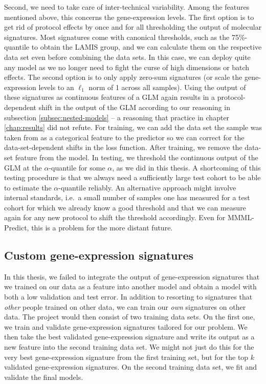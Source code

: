 Second, we need to take care of inter-technical variability. Among the features mentioned above, this concerns 
the gene-expression levels. The first option is to get rid of protocol effects by once and for all
thresholding the output of molecular signatures. Most signatures come with canonical thresholds, 
such as the \num{75}\%-quantile to obtain the LAMIS group, and we can calculate them on the 
respective data set even before combining the data sets. In this case, we can deploy quite any model as we no 
longer need to fight the curse of high dimensions or batch effects. The second option is to only 
apply zero-sum signatures (or scale the gene-expression levels to an $\ell_1$ norm of \num{1} 
across all samples). Using the output of these signatures as continuous features of a GLM again 
results in a protocol-dependent shift in the output of the GLM according to our reasoning in subsection 
\ref{subsec:nested-models} -- a reasoning that practice in chapter \ref{chap:results} did not refute. 
For training, we can add the data set the sample was taken from as a categorical feature to the 
predictor so we can correct for the data-set-dependent shifts in the loss function. 
After training, we remove the data-set feature from the model. In testing, 
we threshold the continuous output of the GLM at the $\alpha$-quantile for some $\alpha$, as we did 
in this thesis. A shortcoming of this testing procedure is that we always need a sufficiently large 
test cohort to be able to estimate the $\alpha$-quantile reliably. An alternative approach might 
involve internal standards, i.e.\ a small number of samples one has measured for a test cohort for 
which we already know a good threshold and that we can measure again for any new protocol to shift 
the threshold accordingly. Even for MMML-Predict, this is a problem for the more distant future.

\subsection{Custom gene-expression signatures}

In this thesis, we failed to integrate the output of gene-expression signatures that we trained 
on our data as a feature into another model and obtain a model with both a low validation and test 
error. In addition to resorting to signatures that \textit{other} people trained on other data, we can train 
our \textit{own} signatures on other data. The project would then consist of two training data 
sets. On the first one, we train and validate gene-expression signatures tailored for our problem.
We then take the best validated gene-expression signature and write its output as a new feature into the 
second training data set. We might not just do this for the very best gene-expression signature 
from the first training set, but for the top $k$ validated gene-expression signatures. On the second 
training data set, we fit and validate the final models.

